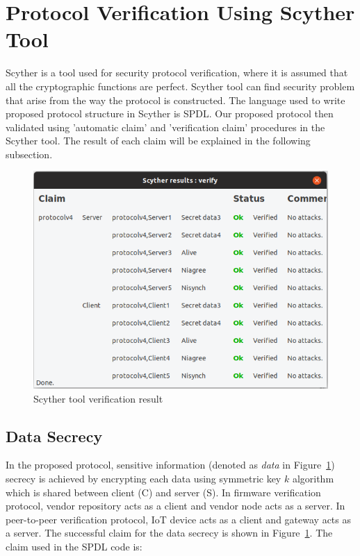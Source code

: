 \section{Protocol Verification Using Scyther Tool} 
\label{sec:protocolAnalysisTool}

Scyther is a tool used for security protocol verification, where it is assumed that all the cryptographic functions are perfect. Scyther tool can find security problem that arise from the way the protocol is constructed. The language used to write proposed protocol structure in Scyther is SPDL. Our proposed protocol then validated using 'automatic claim' and 'verification claim' procedures in the Scyther tool. The result of each claim will be explained in the following subsection.

\begin{figure}[H]
	\begin{center}
		\includegraphics[width=1.0\textwidth]{figures/scyther-result.png}
		\caption{Scyther tool verification result} 
		\label{fig:scytherResult}
	\end{center}
\end{figure}

\subsection{Data Secrecy}

In the proposed protocol, sensitive information (denoted as \textit{data} in Figure~\ref{fig:scytherResult}) secrecy is achieved by encrypting each data using symmetric key $k$ algorithm which is shared between client (C) and server (S). In firmware verification protocol, vendor repository acts as a client and vendor node acts as a server. In peer-to-peer verification protocol, IoT device acts as a client and gateway acts as a server. The successful claim for the data secrecy is shown in Figure~\ref{fig:scytherResult}. The claim used in the SPDL code is:

